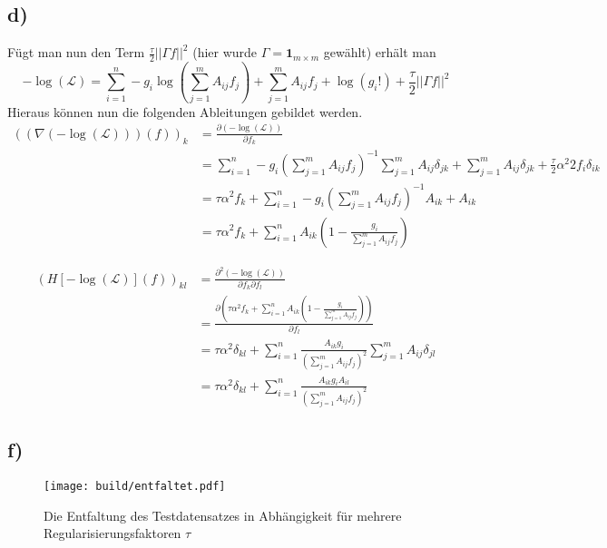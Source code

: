 \subsection*{d)}
Fügt man nun den Term $\frac{\tau}{2}||\Gamma f||^2$ (hier wurde $\Gamma=\mathbf{1}_{m\times m}$ gewählt) erhält man
\begin{equation}
    -\log\left(\mathcal{L}\right) = \sum_{i=1}^n -g_i \log\left(\sum_{j=1}^m A_{ij}f_j\right) + \sum_{j=1}^m A_{ij}f_j + \log\left(g_i!\right) + \frac{\tau}{2}||\Gamma f||^2
\end{equation}
Hieraus können nun die folgenden Ableitungen gebildet werden.
\begin{align}
    \left(\left(\nabla\left(-\log\left(\mathcal{L}\right)\right)\right)\left(f\right)\right)_k &= \frac{\partial \left(-\log\left(\mathcal{L}\right)\right)}{\partial f_k}\nonumber\\
                                        &= \sum_{i=1}^n -g_i \left(\sum_{j=1}^m A_{ij}f_j\right)^{-1}\sum_{j=1}^m A_{ij}\delta_{jk} + \sum_{j=1}^m A_{ij}\delta_{jk} + \frac{\tau}{2} \alpha^2 2f_i \delta_{ik}\nonumber\nonumber\\
                                        &= \tau \alpha^2 f_k + \sum_{i=1}^n -g_i \left(\sum_{j=1}^m A_{ij}f_j\right)^{-1} A_{ik} + A_{ik} \nonumber\\
                                        &= \tau \alpha^2 f_k + \sum_{i=1}^n A_{ik} \left(1-\frac{g_i}{\sum_{j=1}^m A_{ij}f_j}\right)
\end{align}

\begin{align}
    \left(H[-\log\left(\mathcal{L}\right)]\left(f\right)\right)_{kl} &= \frac{\partial^2 \left(-\log\left(\mathcal{L}\right)\right)}{\partial f_k \partial f_l}\nonumber\\
                                    &= \frac{\partial \left(\tau \alpha^2 f_k + \sum_{i=1}^n A_{ik} \left(1-\frac{g_i}{\sum_{j=1}^m A_{ij}f_j}\right)\right)}{\partial f_l}\nonumber\\
                                    &= \tau \alpha^2 \delta_{kl} + \sum_{i=1}^n \frac{A_{ik}g_i}{\left(\sum_{j=1}^m A_{ij}f_j\right)^2}\sum_{j=1}^m A_{ij}\delta_{jl}\nonumber\\
                                    &= \tau \alpha^2 \delta_{kl} + \sum_{i=1}^n \frac{A_{ik}g_iA_{il}}{\left(\sum_{j=1}^m A_{ij}f_j\right)^2}
\end{align}

\subsection*{f)}
\begin{figure}
    \centering
    \texttt{[image: build/entfaltet.pdf]}
    \caption{Die Entfaltung des Testdatensatzes in Abhängigkeit für mehrere Regularisierungsfaktoren $\tau$}
    \label{fig:test}
\end{figure}